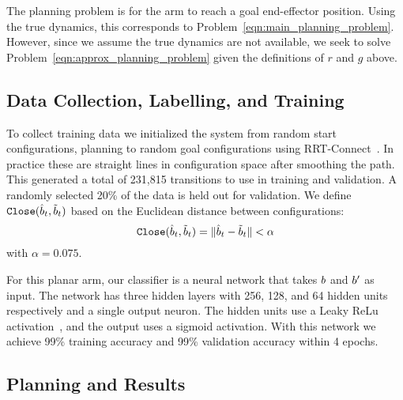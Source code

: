The planning problem is for the arm to reach a goal end-effector position. Using the true dynamics, this corresponds to Problem~\eqref{eqn:main_planning_problem}. However, since we assume the true dynamics are not available, we seek to solve Problem~\eqref{eqn:approx_planning_problem} given the definitions of $r$ and $g$ above.


\subsection{Data Collection, Labelling, and Training}

To collect training data we initialized the system from random start configurations, planning to random goal configurations using RRT-Connect~\cite{kuffner2000rrt}. In practice these are straight lines in configuration space after smoothing the path. This generated a total of 231,815 transitions to use in training and validation. A randomly selected 20\% of the data is held out for validation. We define $\texttt{Close}(\hat{b}_t, \tilde{b}_t)$ based on the Euclidean distance between configurations:
\begin{equation}
    \texttt{Close}(\hat{b}_t, \tilde{b}_t) = \| \hat{b}_t - \tilde{b}_t \| < \alpha
\end{equation}
with $\alpha = 0.075$.

For this planar arm, our classifier is a neural network that takes $b$ and $b'$ as input. The network has three hidden layers with 256, 128, and 64 hidden units respectively and a single output neuron. The hidden units use a Leaky ReLu activation~\cite{maas2013rectifier}, and the output uses a sigmoid activation. With this network we achieve 99\% training accuracy and 99\% validation accuracy within 4 epochs.

\subsection{Planning and Results} 

